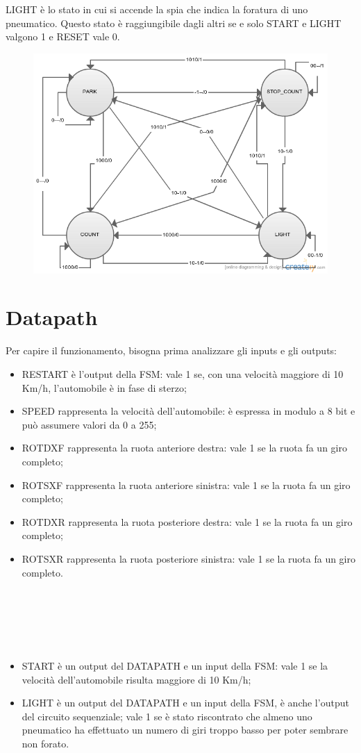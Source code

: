\documentclass[a4paper,titlepage]{book}
\begin{document}
LIGHT è lo stato in cui si accende la spia che indica la foratura di uno pneumatico. Questo stato è raggiungibile dagli altri se e solo START e LIGHT valgono 1 e RESET vale 0.

\begin{figure}[!h]
\centering
\includegraphics[scale=0.5]{fsm.png}
\end{figure}



\chapter{Datapath}

Per capire il funzionamento, bisogna prima analizzare gli inputs e gli outputs:
\begin{itemize}

\item RESTART è l’output della FSM: vale 1 se, con una velocità maggiore di 10 Km/h, l’automobile è in fase di sterzo;
\item SPEED rappresenta la velocità dell’automobile: è espressa in modulo a 8 bit e può assumere valori da 0 a 255;
\item ROTDXF rappresenta la ruota anteriore destra: vale 1 se la ruota fa un giro completo;
\item ROTSXF rappresenta la ruota anteriore sinistra: vale 1 se la ruota fa un giro completo;
\item ROTDXR rappresenta la ruota posteriore destra: vale 1 se la ruota fa un giro completo;
\item ROTSXR rappresenta la ruota posteriore sinistra: vale 1 se la ruota fa un giro completo.

~

~

~

\item START è un output del DATAPATH e un input della FSM: vale 1 se la velocità dell’automobile risulta maggiore di 10 Km/h;
\item LIGHT è un output del DATAPATH e un input della FSM, è anche l’output del circuito sequenziale; vale 1 se è stato riscontrato che almeno uno pneumatico ha effettuato un numero di giri troppo basso per poter sembrare non forato.
\end{itemize}
\end{document}
